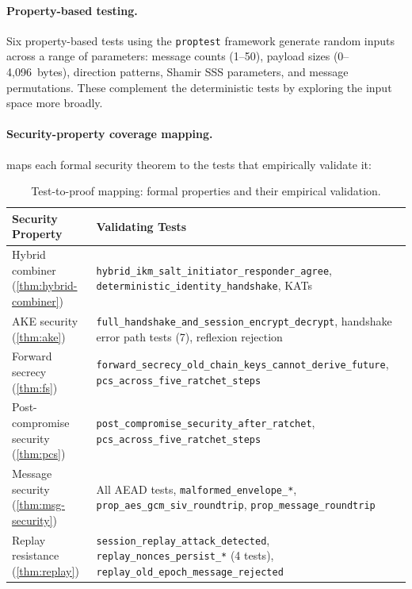 \documentclass[11pt,a4paper]{article}
\theoremstyle{definition}
\begin{document}
\paragraph{Property-based testing.}
Six property-based tests using the \texttt{proptest} framework generate random inputs across a range of parameters: message counts (1--50), payload sizes (0--4{,}096~bytes), direction patterns, Shamir SSS parameters, and message permutations. These complement the deterministic tests by exploring the input space more broadly.

\paragraph{Security-property coverage mapping.}
 maps each formal security theorem to the tests that empirically validate it:

\begin{table}[H]
\centering
\caption{Test-to-proof mapping: formal properties and their empirical validation.}\label{tab:test-proof-mapping}
\small
\begin{tabularx}{\textwidth}{@{}lX@{}}
\toprule
Security Property & Validating Tests \\
\midrule
Hybrid combiner (\cref{thm:hybrid-combiner}) & \texttt{hybrid\_ikm\_salt\_initiator\_responder\_agree}, \texttt{deterministic\_identity\_handshake}, KATs \\
AKE security (\cref{thm:ake}) & \texttt{full\_handshake\_and\_session\_encrypt\_decrypt}, handshake error path tests (7), reflexion rejection \\
Forward secrecy (\cref{thm:fs}) & \texttt{forward\_secrecy\_old\_chain\_keys\_cannot\_derive\_future}, \texttt{pcs\_across\_five\_ratchet\_steps} \\
Post-compromise security (\cref{thm:pcs}) & \texttt{post\_compromise\_security\_after\_ratchet}, \texttt{pcs\_across\_five\_ratchet\_steps} \\
Message security (\cref{thm:msg-security}) & All AEAD tests, \texttt{malformed\_envelope\_*}, \texttt{prop\_aes\_gcm\_siv\_roundtrip}, \texttt{prop\_message\_roundtrip} \\
Replay resistance (\cref{thm:replay}) & \texttt{session\_replay\_attack\_detected}, \texttt{replay\_nonces\_persist\_*} (4 tests), \texttt{replay\_old\_epoch\_message\_rejected} \\
\bottomrule
\end{tabularx}
\end{table}
\end{document}
